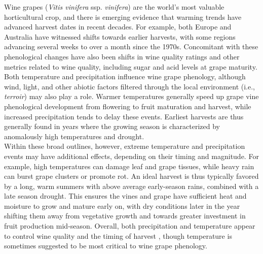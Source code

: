 \documentclass[final]{nature}
\begin{document}
\noindent Wine grapes (\emph{Vitis vinifera} ssp. \emph{vinifera}) are the world's most valuable horticultural crop, and there is emerging evidence that warming trends have advanced harvest dates in recent decades. For example, both Europe\cite{Jones:2000br,schultzjones,tomasi2011,odo2012} and Australia\cite{webb2012} have witnessed shifts towards earlier harvests, with some regions advancing several weeks to over a month since the 1970s\cite{Duchene:2005bd,Seguin2005,webb2011}. Concomitant with these phenological changes have also been shifts in wine quality ratings\cite{jones2005} and other metrics related to wine quality\cite{mori2007}, including sugar and acid levels at grape maturity\cite{Jones:2000br}.\\
\indent Both temperature and precipitation influence wine grape phenology, although wind, light, and other abiotic factors filtered through the local environment (i.e., \emph{terroir}) may also play a role\cite{Gladstones2011}. Warmer temperatures generally speed up grape vine phenological development from flowering to fruit maturation and harvest, while increased precipitation tends to delay these events\cite{jones2013}. Earliest harvests are thus generally found in years where the growing season is characterized by anomalously high temperatures and drought\cite{Jones:2000br}.\\
\indent Within these broad outlines, however, extreme temperature and precipitation events may have additional effects, depending on their timing and magnitude. For example, high temperatures can damage leaf and grape tissues\cite{greer2010,Gladstones2011}, while heavy rain can burst grape clusters or promote rot\cite{jones2013}. An ideal harvest is thus typically favored by a long, warm summers with above average early-season rains, combined with a late season drought. This ensures the vines and grape have sufficient heat and moisture to grow and mature early on, with dry conditions later in the year shifting them away from vegetative growth and towards greater investment in fruit production mid-season\cite{chaves2010,jones2013,baciocco2014}. Overall, both precipitation\cite{vanlee2009} and temperature\cite{baciocco2014} appear to control wine quality and the timing of harvest \cite{odo2012,webb2012}, though temperature is sometimes suggested to be most critical to wine grape phenology\cite{coombe1987,jones2005}.\\
\end{document}
